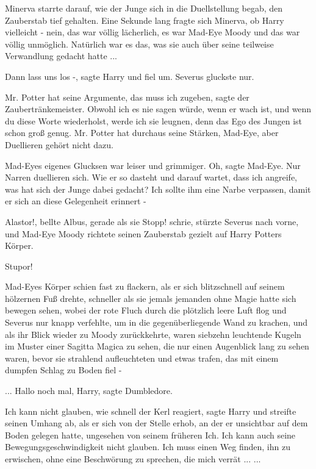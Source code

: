 Minerva starrte darauf, wie der Junge sich in die Duellstellung begab, den
Zauberstab tief gehalten. Eine Sekunde lang fragte sich Minerva, ob Harry
vielleicht - nein, das war völlig lächerlich, es war Mad-Eye Moody und das war
völlig unmöglich. Natürlich war es das, was sie auch über seine teilweise
Verwandlung gedacht hatte ...

\glqq{}Dann lass uns los -\grqq{}, sagte Harry und fiel um. Severus gluckste nur.

\glqq{}Mr. Potter hat seine Argumente, das muss ich zugeben\grqq{}, sagte der
Zaubertränkemeister. \glqq{}Obwohl ich es nie sagen würde, wenn er wach ist, und
wenn du diese Worte wiederholst, werde ich sie leugnen, denn das Ego des Jungen
ist schon groß genug. Mr. Potter hat durchaus seine Stärken, Mad-Eye, aber
Duellieren gehört nicht dazu.\grqq{}

Mad-Eyes eigenes Glucksen war leiser und grimmiger. \glqq{}Oh\grqq{}, sagte
Mad-Eye. \glqq{}Nur Narren duellieren sich. Wie er so dasteht und darauf wartet,
dass ich angreife, was hat sich der Junge dabei gedacht? Ich sollte ihm eine
Narbe verpassen, damit er sich an diese Gelegenheit erinnert -\grqq{}

\glqq{}Alastor!\grqq{}, bellte Albus, gerade als sie \glqq{}Stopp!\grqq{} schrie,
stürzte Severus nach vorne, und Mad-Eye Moody richtete seinen Zauberstab gezielt
auf Harry Potters Körper.

\glqq{}Stupor!\grqq{}

Mad-Eyes Körper schien fast zu flackern, als er sich blitzschnell auf seinem
hölzernen Fuß drehte, schneller als sie jemals jemanden ohne Magie hatte sich
bewegen sehen, wobei der rote Fluch durch die plötzlich leere Luft flog und
Severus nur knapp verfehlte, um in die gegenüberliegende Wand zu krachen, und
als ihr Blick wieder zu Moody zurückkehrte, waren siebzehn leuchtende Kugeln im
Muster einer Sagitta Magica zu sehen, die nur einen Augenblick lang zu sehen
waren, bevor sie strahlend aufleuchteten und etwas trafen, das mit einem dumpfen
Schlag zu Boden fiel -

... \glqq{}Hallo noch mal, Harry\grqq{}, sagte Dumbledore.

\glqq{}Ich kann nicht glauben, wie schnell der Kerl reagiert\grqq{}, sagte Harry
und streifte seinen Umhang ab, als er sich von der Stelle erhob, an der er
unsichtbar auf dem Boden gelegen hatte, ungesehen von seinem früheren Ich. \glqq{}
Ich kann auch seine Bewegungsgeschwindigkeit nicht glauben. Ich muss einen Weg
finden, ihn zu erwischen, ohne eine Beschwörung zu sprechen, die mich
verrät ...\grqq{} ...

